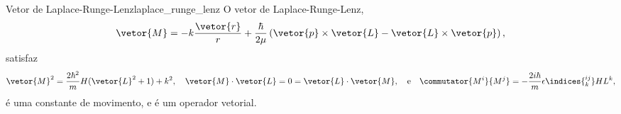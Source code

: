 \begin{theorem}{Vetor de Laplace-Runge-Lenz}{laplace_runge_lenz}
   O vetor de Laplace-Runge-Lenz,
   \begin{equation*}
      \vetor{M} = -k \frac{\vetor{r}}{r} + \frac{\hbar}{2\mu} \left(\vetor{p} \times \vetor{L} - \vetor{L} \times \vetor{p}\right),
   \end{equation*}
   satisfaz
   \begin{equation*}
      \vetor{M}^2 = \frac{2\hbar^2}{m} H(\vetor{L}^2 + 1) + k^2,\quad
      \vetor{M}\cdot\vetor{L} = 0 = \vetor{L}\cdot\vetor{M},
      \quad\text{e}\quad
      \commutator{M^i}{M^j} = -\frac{2i \hbar}{m} \epsilon\indices{^{ij}_k} H L^k,
   \end{equation*}
   é uma constante de movimento, e é um operador vetorial.
\end{theorem}
